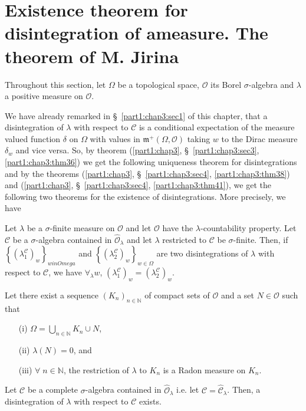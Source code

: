 \section[Existence theorem for disintegration...]{Existence theorem
  for disintegration of a\hfil\break measure. The  
  theorem of M. Jirina}\label{part1:chap3:sec5}

Throughout this section, let $\Omega$ be a topological space,
$\mathscr{O}$ its Borel $\sigma$-algebra and $\lambda$ a positive
measure on $\mathscr{O}$. 

We have already remarked in \S\ \ref{part1:chap3:sec1} of this chapter, that a
disintegration of $\lambda$ with respect to $\mathscr{C}$ is a
conditional expectation of the measure valued function $\delta$ on
$\Omega$ with values in $\mathfrak{m}^+ (\Omega, \mathscr{O})$ taking
$w$ to the Dirac measure $\delta_w$ and vice versa. So, by theorem
(\ref{part1:chap3}, \S\ \ref{part1:chap3:sec3},
\ref{part1:chap3:thm36}) we get the following uniqueness theorem for  
disintegrations and by the theorems (\ref{part1:chap3},
\S\ \ref{part1:chap3:sec4}, \ref{part1:chap3:thm38}) and
(\ref{part1:chap3}, \S\ \ref{part1:chap3:sec4},
\ref{part1:chap3:thm41}), we get the following two theorems for the
existence of disintegrations. More precisely, we have 

\begin{thm}[Uniqueness]\label{part1:chap3:thm42}
Let $\lambda$ be a $\sigma$-finite measure on $\mathscr{O}$ and let
$\mathscr{O}$ have the $\lambda$-countability property. Let $\mathscr{C}$ be a $\sigma$-algebra contained in $\hat{\mathscr{O}}_\lambda$ and let $\lambda$
restricted to $\mathscr{C}$ be $\sigma$-finite. Then, if $\left\{
(\lambda^\mathscr{C}_1)_w \right\}_{w in Omega}$  and $\left\{
(\lambda^\mathscr{C}_2)_w\right\}_{w \in \Omega}$ are two
disintegrations of $\lambda$ with respect to $\mathscr{C}$, we have
$\forall_\lambda w$, $(\lambda^\mathscr{C}_1)_w =
(\lambda^\mathscr{C}_2)_w$.  
\end{thm}

\begin{thm}\label{part1:chap3:thm43}
Let there exist a sequence $(K_n)_{n \in \mathbb{N}}$ of compact sets
of $\mathscr{O}$ and a set $N \in \mathscr{O}$ such that
\begin{itemize}
\item[{\rm (i)}] $\Omega = \bigcup\limits_{n \in \mathbb{N}} K_n \cup
  N$,\pageoriginale 

\item[{\rm (ii)}]  $\lambda(N) = 0$,  and 

\item[{\rm (iii)}] $\forall \;  n \in \mathbb{N}$, the restriction of
  $\lambda$ to $K_n$ is a Radon measure on $K_n$. 
\end{itemize}

Let $\mathscr{C}$ be a complete $\sigma$-algebra contained in
$\hat{\mathscr{O}}_\lambda$ i.e. let $\mathscr{C} =
\hat{\mathscr{C}}_\lambda$. Then, a disintegration of $\lambda$ with
respect to $\mathscr{C}$ exists. 
\end{thm}

